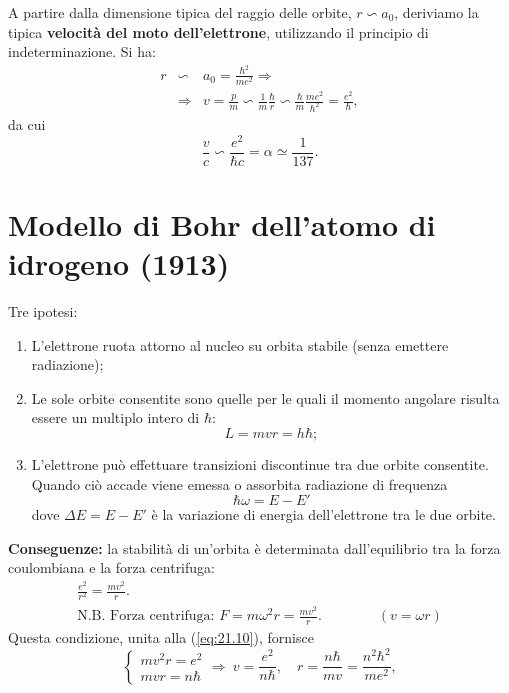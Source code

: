 A partire dalla dimensione tipica del raggio delle orbite, $r \backsim a_0$, deriviamo la tipica \textbf{velocità del moto dell'elettrone}, utilizzando il principio di indeterminazione. Si ha:
\begin{eqnarray}
r & \backsim & a_0 =\frac{\hbar ^2}{me^2} \Rightarrow \nonumber \\
& \Rightarrow & v=\frac{p}{m} \backsim \frac{1}{m} \frac{\hbar}{r}\backsim \frac{\hbar}{m}\frac{me^2}{\hbar ^2}=\frac{e^2}{\hbar}, 
\end{eqnarray}
da cui
\begin{equation}
\frac{v}{c}\backsim \frac{e^2}{\hbar c}=\alpha \simeq \frac{1}{137}.
\end{equation}
\section{Modello di Bohr dell'atomo di idrogeno (1913)}
Tre ipotesi:
\begin{enumerate}
\item L'elettrone ruota attorno al nucleo su orbita stabile (senza emettere radiazione);
\item Le sole orbite consentite sono quelle per le quali il momento angolare risulta essere un multiplo intero di $\hbar$:
\begin{equation}
L=mvr=h\hbar;
\label{eq:21.10}
\end{equation}
\item L'elettrone può effettuare transizioni discontinue tra due orbite consentite. Quando ciò accade viene emessa o assorbita radiazione di frequenza
\begin{equation}
\hbar \omega = E-E'
\end{equation}
dove $\Delta E = E-E'$ è la variazione di energia dell'elettrone tra le due orbite.
\end{enumerate}
\textbf{Conseguenze:} la stabilità di un'orbita è determinata dall'equilibrio tra la forza coulombiana e la forza centrifuga:
\begin{eqnarray}
&\displaystyle{\frac{e^2}{r^2}=\frac{mv^2}{r}.}&\\
&\textrm{N.B. Forza centrifuga: } F=m\omega ^2 r = \frac{mv^2}{r}. \qquad \qquad (v=\omega r)& \nonumber
\end{eqnarray}
Questa condizione, unita alla (\ref{eq:21.10}), fornisce
\begin{equation}
\begin{cases}
mv^2r=e^2\\
mvr=n\hbar
\end{cases}
\Rightarrow \ v=\frac{e^2}{n\hbar}, \quad r=\frac{n\hbar}{mv}=\frac{n^2\hbar ^2}{me^2},
\end{equation}
